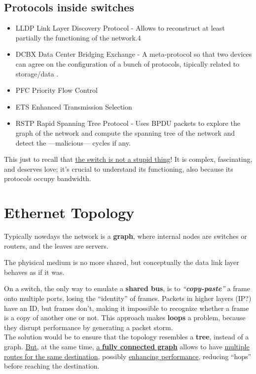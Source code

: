 \subsection{Protocols inside switches}
\begin{itemize}
   \item LLDP Link Layer Discovery Protocol - Allows to reconstruct at least partially the functioning of the network.4
   \item DCBX Data Center Bridging Exchange - A meta-protocol so that two devices can agree on the configuration of a bunch of protocols, tipically related to storage/data 
   .
   \item PFC Priority Flow Control
   \item ETS Enhanced Transmission Selection
   \item RSTP Rapid Spanning Tree Protocol - Uses BPDU packets to explore the graph of the network and compute the spanning tree of the network and detect the ---malicious--- cycles if any.
\end{itemize}

This just to recall that \ul{the switch is not a stupid thing}! It is complex, fascinating, and deserves love; it's crucial to understand its functioning, also because its protocols occupy bandwidth.

\section{Ethernet Topology}
Typically nowdays the network is a \textbf{graph}, where internal nodes are switches or routers, and the leaves are servers.

The phyisical medium is no more shared, but conceptually the data link layer behaves as if it was.

On a switch, the only way to emulate a \textbf{shared bus}, is to \textit{``\textbf{copy-paste}''} a frame onto multiple ports, losing the ``identity'' of frames. Packets in higher layers (IP?) have an ID, but frames don't, making it impossible to recognize whether a frame is a copy of another one or not.
This approach makes \textbf{loops} a problem, because they disrupt performance by generating a packet storm.\\
The solution would be to ensure that the topology resembles a \textbf{tree}, instead of a graph.
\ul{But}, at the same time, \ul{a \textbf{fully connected graph}} allows to have \ul{multiple routes for the same destination}, possibly \ul{enhancing performance}, reducing ``hops'' before reaching the destination.

